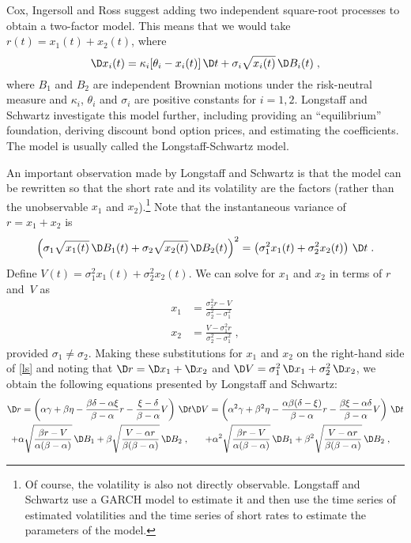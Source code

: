 Cox, Ingersoll and Ross suggest adding two independent square-root processes to obtain a two-factor model.  This means that we would take $r(t)=x_1(t)+x_2(t)$, where
\begin{equation}\label{ls}
\D x_i(t) = \kappa_i[\theta_i-x_i(t)]\,\D t + \sigma_i\sqrt{x_i(t)}\,\D B_i(t)\;,
\end{equation}
where $B_1$ and $B_2$ are independent Brownian motions under the risk-neutral measure and $\kappa_i$, $\theta_i$ and $\sigma_i$ are positive constants for $i=1,2$.  Longstaff and Schwartz \cite{LS92} investigate this model further, including providing an ``equilibrium'' foundation, deriving discount bond option prices, and estimating the coefficients.  The model is usually called the Longstaff-Schwartz model.  

An important observation made by Longstaff and Schwartz is that the model can be rewritten so that the short rate and its volatility are the factors (rather than the unobservable $x_1$ and $x_2$).\footnote{Of course, the volatility is also not directly observable.  Longstaff and Schwartz use a GARCH model to estimate it and then use the time series of estimated volatilities and the time series of short rates to estimate the parameters of the model.}  Note that the instantaneous variance of $r = x_1+x_2$ is
$$\left( \sigma_1\sqrt{x_1(t)}\,\D B_1(t) +  \sigma_2\sqrt{x_2(t)}\,\D B_2(t)\right)^2 = \left(\sigma_1^2x_1(t) + \sigma_2^2x_2(t)\right)\,\D t\; .$$
Define $V(t) = \sigma_1^2x_1(t) + \sigma_2^2x_2(t)$.  We can solve for $x_1$ and $x_2$ in terms of $r$ and~$V$ as
\begin{subequations}\label{x12lscombined}
\begin{align}
x_1 &= \frac{\sigma_2^2 r - V}{\sigma_2^2-\sigma_1^2}\label{x1ls}\\
x_2 &= \frac{V-\sigma_1^2 r}{\sigma_2^2-\sigma_1^2}\;,\label{x2ls}
\end{align}
\end{subequations}
provided $\sigma_1\neq \sigma_2$.  Making these substitutions for $x_1$ and $x_2$ on the right-hand side of  \eqref{ls} and noting that $\D r = \D x_1+\D x_2$ and $\D V = \sigma_1^2\,\D x_1 + \sigma_2^2\,\D x_2$, we obtain the following equations presented by Longstaff and Schwartz:
\begin{subequations}
\begin{multline}
\D r= \left(\alpha\gamma + \beta\eta - \frac{\beta\delta-\alpha\xi}{\beta-\alpha}r - \frac{\xi-\delta}{\beta-\alpha}V\right)\,\D t \\+ \alpha\sqrt{\frac{\beta r-V}{\alpha(\beta-\alpha)}}\,\D B_1 + \beta\sqrt{\frac{V-\alpha r}{\beta(\beta-\alpha)}}\,\D B_2\;,
\end{multline}
\begin{multline}
\D V= \left(\alpha^2\gamma + \beta^2\eta - \frac{\alpha\beta(\delta-\xi)}{\beta-\alpha}r - \frac{\beta\xi-\alpha\delta}{\beta-\alpha}V\right)\,\D t \\+ \alpha^2\sqrt{\frac{\beta r-V}{\alpha(\beta-\alpha)}}\,\D B_1 + \beta^2\sqrt{\frac{V-\alpha r}{\beta(\beta-\alpha)}}\,\D B_2\;,
\end{multline}
\end{subequations}
